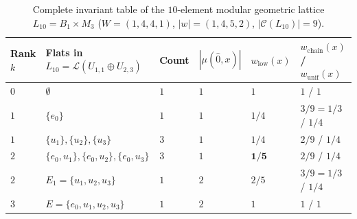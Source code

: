 \documentclass[11pt]{article}
\theoremstyle{definition}
\theoremstyle{remark}
\begin{document}
\begin{table}[htbp]
\centering
\small
\renewcommand{\arraystretch}{1.2}
\begin{tabular}{@{}llllll@{}}
\toprule
\textbf{Rank $k$} & \textbf{Flats in $L_{10} = \mathcal{L}(U_{1,1} \oplus U_{2,3})$} & \textbf{Count} & $|\mu(\hat{0}, x)|$ & $w_{\mathrm{low}}(x)$ & $w_{\mathrm{chain}}(x)$ / $w_{\mathrm{unif}}(x)$ \\
\midrule
$0$ & $\emptyset$ & $1$ & $1$ & $1$ & $1$ \;/\; $1$ \\
$1$ & $\{e_0\}$ & $1$ & $1$ & $1/4$ & $3/9 = 1/3$ \;/\; $1/4$ \\
$1$ & $\{u_1\}, \{u_2\}, \{u_3\}$ & $3$ & $1$ & $1/4$ & $2/9$ \;/\; $1/4$ \\
$2$ & $\{e_0, u_1\}, \{e_0, u_2\}, \{e_0, u_3\}$ & $3$ & $1$ & $\mathbf{1/5}$ & $2/9$ \;/\; $1/4$ \\
$2$ & $E_1 = \{u_1, u_2, u_3\}$ & $1$ & $2$ & $2/5$ & $3/9 = 1/3$ \;/\; $1/4$ \\
$3$ & $E = \{e_0, u_1, u_2, u_3\}$ & $1$ & $2$ & $1$ & $1$ \;/\; $1$ \\
\bottomrule
\end{tabular}
\caption{Complete invariant table of the $10$-element modular geometric lattice $L_{10} = B_1 \times M_3$ ($W = (1,4,4,1)$, $|w| = (1,4,5,2)$, $|\mathcal{C}(L_{10})| = 9$).}
\label{tab:L10}
\end{table}
\end{document}
